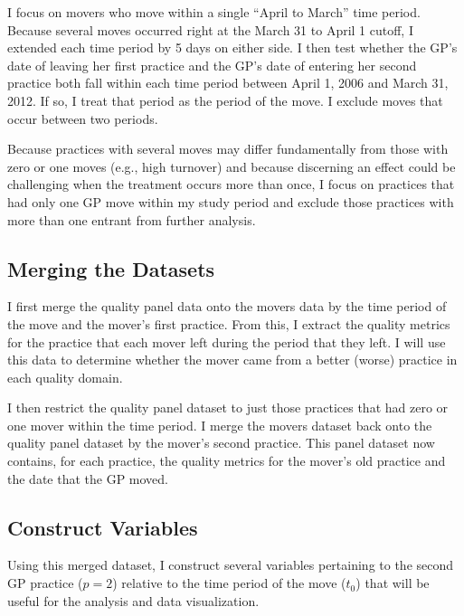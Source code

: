 \documentclass[11pt]{article}
\begin{document}
I focus on movers who move within a single ``April to March'' time period. Because several moves occurred right at the March 31 to April 1 cutoff, I extended each time period by 5 days on either side. I then test whether the GP's date of leaving her first practice and the GP's date of entering her second practice both fall within each time period between April 1, 2006 and March 31, 2012. If so, I treat that period as the period of the move. I exclude moves that occur between two periods.

Because practices with several moves may differ fundamentally from those with zero or one moves (e.g., high turnover) and because discerning an effect could be challenging when the treatment occurs more than once, I focus on practices that had only one GP move within my study period and exclude those practices with more than one entrant from further analysis.


\subsection{Merging the Datasets}
I first merge the quality panel data onto the movers data by the time period of the move and the mover's first practice. From this, I extract the quality metrics for the practice that each mover left during the period that they left. I will use this data to determine whether the mover came from a better (worse) practice in each quality domain.

I then restrict the quality panel dataset to just those practices that had zero or one mover within the time period. I merge the movers dataset back onto the quality panel dataset by the mover's second practice. This panel dataset now contains, for each practice, the quality metrics for the mover's old practice and the date that the GP moved.


\subsection{Construct Variables}

Using this merged dataset, I construct several variables pertaining to the second GP practice ($p=2$) relative to the time period of the move ($t_0$) that will be useful for the analysis and data visualization.
\end{document}
